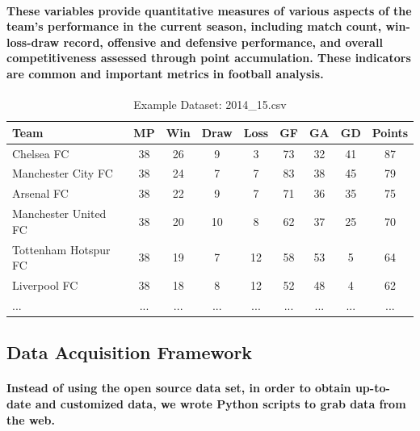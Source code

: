 \paragraph{These variables provide quantitative measures of various aspects of the team's performance in the current season, including match count, win-loss-draw record, offensive and defensive performance, and overall competitiveness assessed through point accumulation. These indicators are common and important metrics in football analysis.}
% 
% 
% 
\begin{center}
\begin{table}
    \caption{Example Dataset: 2014\_15.csv}
    \begin{tabular}{lcccccccc}
        \toprule
        \textbf{Team} & \textbf{MP} & \textbf{Win} & \textbf{Draw} & \textbf{Loss} & \textbf{GF} & \textbf{GA} & \textbf{GD} & \textbf{Points} \\
        \midrule
        Chelsea FC & 38 & 26 & 9 & 3 & 73 & 32 & 41 & 87 \\
        Manchester City FC & 38 & 24 & 7 & 7 & 83 & 38 & 45 & 79 \\
        Arsenal FC & 38 & 22 & 9 & 7 & 71 & 36 & 35 & 75 \\
        Manchester United FC & 38 & 20 & 10 & 8 & 62 & 37 & 25 & 70 \\
        Tottenham Hotspur FC & 38 & 19 & 7 & 12 & 58 & 53 & 5 & 64 \\
        Liverpool FC & 38 & 18 & 8 & 12 & 52 & 48 & 4 & 62 \\
        ... & ... & ... & ... & ... & ... & ... & ... & ... \\
        \bottomrule
    \end{tabular}
\end{table}
\end{center}
% 
% 
\subsection{Data Acquisition Framework}
% 
\paragraph{Instead of using the open source data set, in order to obtain up-to-date and customized data, we wrote Python scripts to grab data from the web.}
